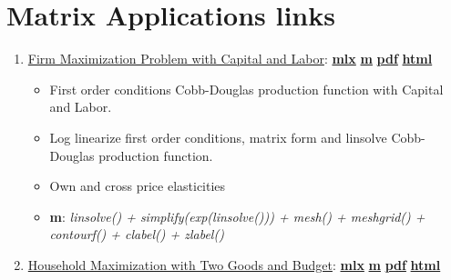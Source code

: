 \documentclass[
]{book}
\providecommand{\tightlist}{%
  \setlength{\itemsep}{0pt}\setlength{\parskip}{0pt}}
\begin{document}
\hypertarget{matrix-applications-links}{%
\section{Matrix Applications links}\label{matrix-applications-links}}

\begin{enumerate}
\def\labelenumi{\arabic{enumi}.}
\tightlist
\item
  \href{https://Math4Econ.github.io/matrix_application/htmlpdfm/KL_borrowhire_firm.html}{Firm Maximization Problem with Capital and Labor}: \href{https://github.com/Math4Econ/Math4Econ.github.io/blob/main/matrix_application/KL_borrowhire_firm.mlx}{\textbf{mlx}} \textbar{} \href{https://github.com/Math4Econ/Math4Econ.github.io/blob/main/matrix_application/htmlpdfm/KL_borrowhire_firm.m}{\textbf{m}} \textbar{} \href{https://github.com/Math4Econ/Math4Econ.github.io/blob/main/matrix_application/htmlpdfm/KL_borrowhire_firm.pdf}{\textbf{pdf}} \textbar{} \href{https://Math4Econ.github.io/matrix_application/htmlpdfm/KL_borrowhire_firm.html}{\textbf{html}}

  \begin{itemize}
  \tightlist
  \item
    First order conditions Cobb-Douglas production function with Capital and Labor.
  \item
    Log linearize first order conditions, matrix form and linsolve Cobb-Douglas production function.
  \item
    Own and cross price elasticities
  \item
    \textbf{m}: \emph{linsolve() + simplify(exp(linsolve())) + mesh() + meshgrid() + contourf() + clabel() + zlabel()}
  \end{itemize}
\item
  \href{https://Math4Econ.github.io/matrix_application/htmlpdfm/twogoods.html}{Household Maximization with Two Goods and Budget}: \href{https://github.com/Math4Econ/Math4Econ.github.io/blob/main/matrix_application/twogoods.mlx}{\textbf{mlx}} \textbar{} \href{https://github.com/Math4Econ/Math4Econ.github.io/blob/main/matrix_application/htmlpdfm/twogoods.m}{\textbf{m}} \textbar{} \href{https://github.com/Math4Econ/Math4Econ.github.io/blob/main/matrix_application/htmlpdfm/twogoods.pdf}{\textbf{pdf}} \textbar{} \href{https://Math4Econ.github.io/matrix_application/htmlpdfm/twogoods.html}{\textbf{html}}


\end{enumerate}
\end{document}
